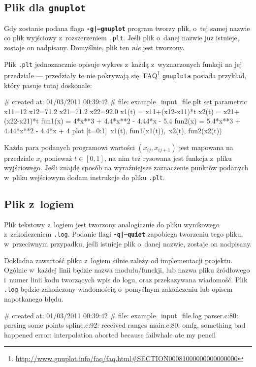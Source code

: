 \documentclass[10pt,a4paper]{article}
\newcommand{\prog}[1]{\texttt{#1}}
\newcommand{\flag}[1]{\textbf{\prog{#1}}}
\begin{document}
\subsection{Plik dla \texttt{gnuplot}}
\label{sec:plik_gnuplot}

Gdy zostanie podana flaga \flag{-g|--gnuplot} program tworzy plik, o~tej samej
nazwie co plik wyjściowy z~rozszerzeniem \prog{.plt}. Jeśli plik o~danej nazwie
już istnieje, zostaje on nadpisany. Domyślnie, plik ten \emph{nie} jest
tworzony.

Plik \prog{.plt} jednoznacznie opisuje wykres z~każdą z~wyznaczonych funkcji
na jej przedziale --- przedziały te nie pokrywają się.
FAQ\footnote{\url{http://www.gnuplot.info/faq/faq.html\#SECTION00081000000000000000}}
\texttt{gnuplota} posiada przykład, który pasuje tutaj doskonale:
\vspace{-12pt}
\begin{SmallVerbatim}
    # created at: 01/03/2011 00:39:42
    #       file: example_input_file.plt
    set parametric
    x11=12
    x12=71.2
    x21=71.2
    x22=92.0
    x1(t) = x11+(x12-x11)*t
    x2(t) = x21+(x22-x21)*t
    fun1(x) = 4*x**3 + 4.4*x**2 - 4.44*x - 5.4
    fun2(x) = 5.4*x**3 + 4.44*x**2 - 4.4*x + 4
    plot [t=0:1]\
      x1(t), fun1(x1(t)),\
      x2(t), fun2(x2(t))
\end{SmallVerbatim}

Każda para podanych programowi wartości $(x_{ij}, x_{ij+1})$ jest mapowana na
przedziale $x_{i}$ ponieważ $t \in [0,1]$, na nim też rysowana jest funkcja
z~pliku wyjściowego. Jeśli znajdę sposób na wyraźniejsze zaznaczenie punktów
podanych w~pliku wejściowym dodam instrukcje do pliku \prog{.plt}.

\subsection{Plik z~logiem}
\label{sec:plik_log}

Plik tekstowy z~logiem jest tworzony analogicznie do pliku wynikowego
z~zakończeniem \prog{.log}. Podanie flagi \flag{-q|--quiet} zapobiega tworzeniu
tego pliku, w~przeciwnym przypadku, jeśli istnieje plik o~danej nazwie, zostaje
on nadpisany.

Dokładna zawartość pliku z~logiem silnie zależy od implementacji projektu.
Ogólnie w~każdej linii będzie nazwa modułu/funckji, lub nazwa pliku źródłowego
i~numer linii kodu tworzących wpis do logu, oraz przekazywana wiadomość. Plik
\prog{.log} będzie zakończony wiadomością o~pomyślnym zakończeniu lub opisem
napotkanego błędu.
\vspace{-12pt}
\begin{SmallVerbatim}
    # created at: 01/03/2011 00:39:42
    #       file: example_input_file.log
    parser.c:80: parsing some points
    spline.c:92: received ranges
    main.c:80: omfg, something bad happened
    error: interpolation aborted because failwhale ate my pencil
\end{SmallVerbatim}
\end{document}
